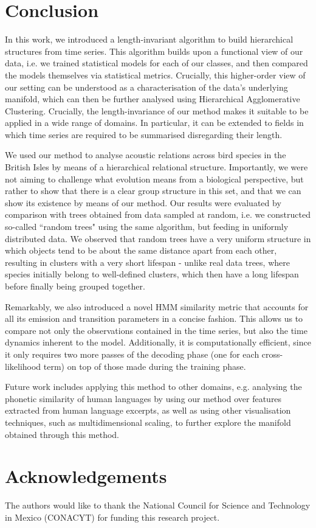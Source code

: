 \documentclass[pdftex,11pt,a4paper]{article}
\theoremstyle{definition}
\theoremstyle{remark}
\begin{document}
\section{Conclusion}
\label{section_conclusion}
In this work, we introduced a length-invariant algorithm to build hierarchical structures from time series. This algorithm builds upon a functional view of our data, i.e. we trained statistical models for each of our classes, and then compared the models themselves via statistical metrics. Crucially, this higher-order view of our setting can be understood as a characterisation of the data's underlying manifold, which can then be further analysed using Hierarchical Agglomerative Clustering. Crucially, the length-invariance of our method makes it suitable to be applied in a wide range of domains. In particular, it can be extended to fields in which time series are required to be summarised disregarding their length.
\par We used our method to analyse acoustic relations across bird species in the British Isles by means of a hierarchical relational structure. Importantly, we were not aiming to challenge what evolution means from a biological perspective, but rather to show that there is a clear group structure in this set, and that we can show its existence by means of our method. Our results were evaluated by comparison with trees obtained from data sampled at random, i.e. we constructed so-called ``random trees" using the same algorithm, but feeding in uniformly distributed data. We observed that random trees have a very uniform structure in which objects tend to be about the same distance apart from each other, resulting in clusters with a very short lifespan - unlike real data trees, where species initially belong to well-defined clusters, which then have a long lifespan before finally being grouped together.
\par Remarkably, we also introduced a novel HMM similarity metric that accounts for all its emission and transition parameters in a concise fashion. This allows us to compare not only the observations contained in the time series, but also the time dynamics inherent to the model. Additionally, it is computationally efficient, since it only requires two more passes of the decoding phase (one for each cross-likelihood term) on top of those made during the training phase.
\par Future work includes applying this method to other domains, e.g. analysing the phonetic similarity of human languages by using our method over features extracted from human language excerpts, as well as using other visualisation techniques, such as multidimensional scaling, to further explore the manifold obtained through this method.

\section*{Acknowledgements}
The authors would like to thank the National Council for Science and Technology in Mexico (CONACYT) for funding this research project. 




\end{document}
